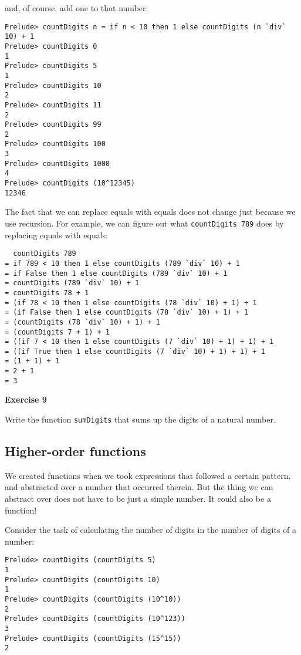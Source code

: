 \documentclass[11pt,
  american,
  DIV13]{article}
\begin{document}
and, of course, add one to that number:

\begin{verbatim}
Prelude> countDigits n = if n < 10 then 1 else countDigits (n `div` 10) + 1
Prelude> countDigits 0
1
Prelude> countDigits 5
1
Prelude> countDigits 10
2
Prelude> countDigits 11
2
Prelude> countDigits 99
2
Prelude> countDigits 100
3
Prelude> countDigits 1000
4
Prelude> countDigits (10^12345)
12346
\end{verbatim}

The fact that we can replace equals with equals does not change just
because we use recursion. For example, we can figure out what
\texttt{countDigits\ 789} does by replacing equals with equals:

\begin{verbatim}
  countDigits 789
= if 789 < 10 then 1 else countDigits (789 `div` 10) + 1
= if False then 1 else countDigits (789 `div` 10) + 1
= countDigits (789 `div` 10) + 1
= countDigits 78 + 1
= (if 78 < 10 then 1 else countDigits (78 `div` 10) + 1) + 1
= (if False then 1 else countDigits (78 `div` 10) + 1) + 1
= (countDigits (78 `div` 10) + 1) + 1
= (countDigits 7 + 1) + 1
= ((if 7 < 10 then 1 else countDigits (7 `div` 10) + 1) + 1) + 1
= ((if True then 1 else countDigits (7 `div` 10) + 1) + 1) + 1
= (1 + 1) + 1
= 2 + 1
= 3
\end{verbatim}

\textbf{Exercise 9}

Write the function \texttt{sumDigits} that sums up the digits of a
natural number.

\hypertarget{higher-order-functions}{%
\subsection{Higher-order functions}\label{higher-order-functions}}

We created functions when we took expressions that followed a certain
pattern, and abstracted over a number that occurred therein. But the
thing we can abstract over does not have to be just a simple number. It
could also be a function!

Consider the task of calculating the number of digits in the number of
digits of a number:

\begin{verbatim}
Prelude> countDigits (countDigits 5)
1
Prelude> countDigits (countDigits 10)
1
Prelude> countDigits (countDigits (10^10))
2
Prelude> countDigits (countDigits (10^123))
3
Prelude> countDigits (countDigits (15^15))
2
\end{verbatim}
\end{document}
